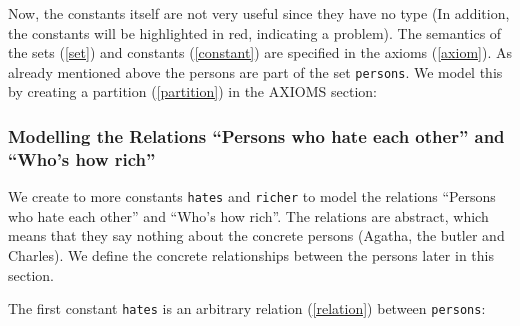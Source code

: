 
Now, the constants itself are not very useful since they have no type (In addition, the constants will be highlighted in red, indicating a problem). The semantics of the sets (\ref{set}) and constants (\ref{constant}) are specified in the axioms (\ref{axiom}). As already mentioned above the persons are part of the set \texttt{persons}. We model this by creating a partition (\ref{partition}) in the \textsf{AXIOMS} section: 




\subsubsection{Modelling the Relations ``Persons who hate each other'' and ``Who's how rich''}

We create to more constants \texttt{hates} and \texttt{richer} to model the relations ``Persons who hate each other'' and ``Who's how rich''. The relations are abstract, which means that they say nothing about the concrete persons (Agatha, the butler and Charles). We define the concrete relationships between the persons later in this section.

The first constant \texttt{hates} is an arbitrary relation (\ref{relation}) between \texttt{persons}: 

